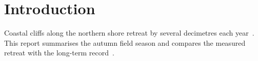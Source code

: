 \section{Introduction}
Coastal cliffs along the northern shore retreat by several decimetres each
year~\cite{bird2008}. This report summarises the autumn field season and
compares the measured retreat with the long-term record~\cite{stephenson2013}.
